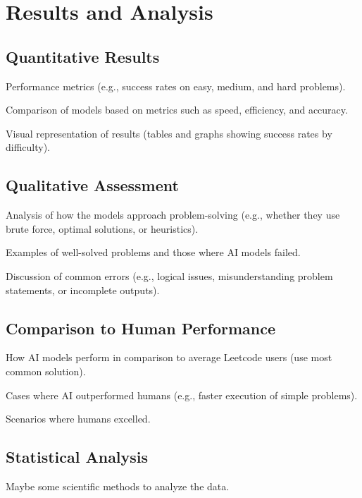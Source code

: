 \section{Results and Analysis}

\subsection{Quantitative Results}

Performance metrics (e.g., success rates on easy, medium, and hard problems).

Comparison of models based on metrics such as speed, efficiency, and accuracy.

Visual representation of results (tables and graphs showing success rates by difficulty).

\subsection{Qualitative Assessment}

Analysis of how the models approach problem-solving (e.g., whether they use brute force, optimal solutions, or heuristics).

Examples of well-solved problems and those where AI models failed.

Discussion of common errors (e.g., logical issues, misunderstanding problem statements, or incomplete outputs).

\subsection{Comparison to Human Performance}

How AI models perform in comparison to average Leetcode users (use most common solution).

Cases where AI outperformed humans (e.g., faster execution of simple problems).

Scenarios where humans excelled.
\subsection{Statistical Analysis}

Maybe some scientific methods to analyze the data.




